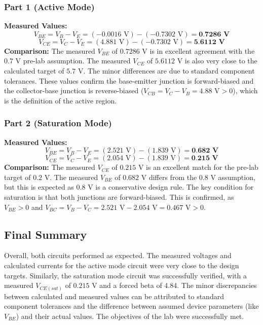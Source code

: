 \subsubsection*{Part 1 (Active Mode)}
\noindent\textbf{Measured Values:}
\[ V_{BE} = V_B - V_E = (-0.0016 \text{ V}) - (-0.7302 \text{ V}) = \textbf{0.7286 V} \]
\[ V_{CE} = V_C - V_E = (4.881 \text{ V}) - (-0.7302 \text{ V}) = \textbf{5.6112 V} \]
\noindent\textbf{Comparison:} The measured $V_{BE}$ of \textbf{$0.7286 \text{ V}$} is in excellent agreement with the \textbf{$0.7 \text{ V}$} pre-lab assumption. The measured $V_{CE}$ of \textbf{$5.6112 \text{ V}$} is also very close to the calculated target of \textbf{$5.7 \text{ V}$}. The minor differences are due to standard component tolerances. These values confirm the base-emitter junction is forward-biased and the collector-base junction is reverse-biased ($V_{CB} = V_C - V_B = 4.88 \text{ V} > 0$), which is the definition of the active region.

\subsubsection*{Part 2 (Saturation Mode)}
\noindent\textbf{Measured Values:}
\[ V_{BE} = V_B - V_E = (2.521 \text{ V}) - (1.839 \text{ V}) = \textbf{0.682 V} \]
\[ V_{CE} = V_C - V_E = (2.054 \text{ V}) - (1.839 \text{ V}) = \textbf{0.215 V} \]
\noindent\textbf{Comparison:} The measured $V_{CE}$ of \textbf{$0.215 \text{ V}$} is an excellent match for the pre-lab target of \textbf{$0.2 \text{ V}$}. The measured $V_{BE}$ of \textbf{$0.682 \text{ V}$} differs from the $0.8 \text{ V}$ assumption, but this is expected as $0.8 \text{ V}$ is a conservative design rule. The key condition for saturation is that both junctions are forward-biased. This is confirmed, as $V_{BE} > 0$ and $V_{BC} = V_B - V_C = 2.521 \text{ V} - 2.054 \text{ V} = 0.467 \text{ V} > 0$.

\subsection*{Final Summary}
Overall, both circuits performed as expected. The measured voltages and calculated currents for the active mode circuit were very close to the design targets. Similarly, the saturation mode circuit was successfully verified, with a measured $V_{CE(sat)}$ of $0.215 \text{ V}$ and a forced beta of 4.84. The minor discrepancies between calculated and measured values can be attributed to standard component tolerances and the difference between assumed device parameters (like $V_{BE}$) and their actual values. The objectives of the lab were successfully met.

